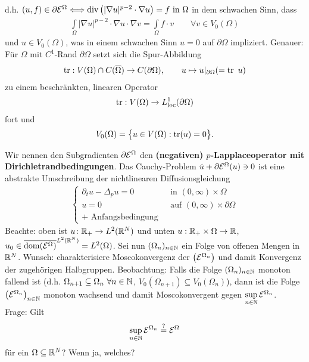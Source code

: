 d.h. $(u,f)\in\partial\mathcal{E}^\Omega
\Longleftrightarrow
\operatorname{div}\left(|\nabla u|^{p-2}\cdot\nabla u\right)=f\text{ in }\Omega$ 
in dem schwachen Sinn, dass
\begin{align*}
	\int\limits_\Omega|\nabla u|^{p-2}\cdot\nabla u\cdot\nabla v=\int\limits_\Omega f\cdot v\qquad\forall v\in V_0(\Omega)
\end{align*}
und $u\in V_0(\Omega)$, was in einem schwachen Sinn $u=0$ auf $\partial\Omega$ impliziert.
Genauer:\\ Für $\Omega$ mit $C^1$-Rand $\partial\Omega$ setzt sich die Spur-Abbildung
\begin{align*}
	\operatorname{tr}:V(\Omega)\cap C(\overline{\Omega})\to C(\partial\Omega),\qquad u\mapsto u|_{\partial\Omega}(=\operatorname{tr}~u)
\end{align*}
zu einem beschränkten, linearen Operator 
\begin{align*}
	\operatorname{tr}:V(\Omega)\to L_{\text{loc}}^1(\partial\Omega)
\end{align*}
fort und 
\begin{align*}
	V_0(\Omega)=\big\lbrace u\in V(\Omega):\operatorname{tr}(u)=0\big\rbrace.
\end{align*}

Wir nennen den Subgradienten $\partial\mathcal{E}^\Omega$ den \textbf{(negativen) $p$-Lapplaceoperator mit Dirichletrandbedingungen}.
Das Cauchy-Problem $\dot{u}+\partial\mathcal{E}^\Omega(u)\ni 0$ ist eine abstrakte Umschreibung der nichtlinearen Diffusionsgleichung
\begin{align*}
	\left\lbrace\begin{array}{rl}
		\partial_t u-\Delta_p u=0&\text{ in }(0,\infty)\times\Omega\\
		u=0 &\text{ auf }(0,\infty)\times\partial\Omega\\
		\text{+ Anfangsbedingung }&
	\end{array}\right.	
\end{align*}
Beachte: oben ist $u\colon \mathbb{R}_+\to L^2(\mathbb{R}^N)$ und unten $u:\mathbb{R}_+\times\Omega\to\mathbb{R}$,\\ $u_0\in\overline{\operatorname{dom}(\mathcal{E}^\Omega)}^{L^2(\mathbb{R}^N)}=L^2(\Omega)$.\nl
Sei nun $(\Omega_n)_{n\in\mathbb{N}}$ ein Folge von offenen Mengen in $\mathbb{R}^N$.
Wunsch: charakterisiere Moscokonvergenz der $\big(\mathcal{E}^{\Omega_n}\big)$ und damit Konvergenz der zugehörigen Halbgruppen.\nl
Beobachtung:
Falls die Folge $(\Omega_n)_{n\in\mathbb{N}}$ monoton fallend ist 
(d.h. $\Omega_{n+1}\subseteq\Omega_n~\forall n\in\mathbb{N}$, $V_0(\Omega_{n+1})\subseteq V_0(\Omega_n)$), 
dann ist die Folge $\big(\mathcal{E}^{\Omega_n}\big)_{n\in\mathbb{N}}$ monoton wachsend und damit Moscokonvergent gegen $\sup\limits_{n\in\mathbb{N}}\mathcal{E}^{\Omega_n}$.\\
Frage: Gilt
\begin{align*}
	\sup\limits_{n\in\mathbb{N}}\mathcal{E}^{\Omega_n}\overset{?}{=}\mathcal{E}^\Omega
\end{align*}
für ein $\Omega\subseteq\mathbb{R}^N$? Wenn ja, welches?

